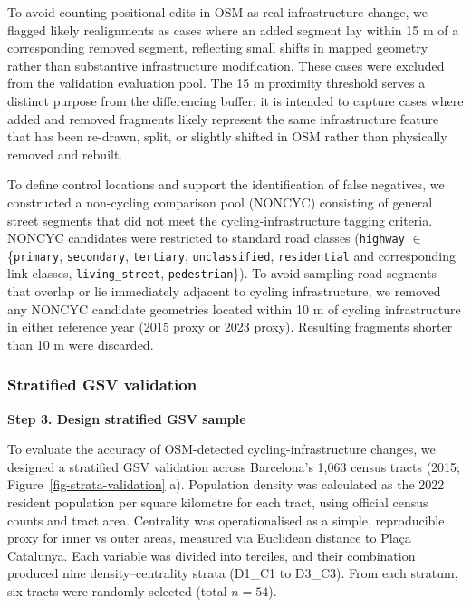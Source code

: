\documentclass[
]{article}
\begin{document}
To avoid counting positional edits in OSM as real infrastructure change,
we flagged likely realignments as cases where an added segment lay
within 15 m of a corresponding removed segment, reflecting small shifts
in mapped geometry rather than substantive infrastructure modification.
These cases were excluded from the validation evaluation pool. The 15 m
proximity threshold serves a distinct purpose from the differencing
buffer: it is intended to capture cases where added and removed
fragments likely represent the same infrastructure feature that has been
re-drawn, split, or slightly shifted in OSM rather than physically
removed and rebuilt.

To define control locations and support the identification of false
negatives, we constructed a non-cycling comparison pool (NONCYC)
consisting of general street segments that did not meet the
cycling-infrastructure tagging criteria. NONCYC candidates were
restricted to standard road classes (\texttt{highway} \(\in\)
\{\texttt{primary}, \texttt{secondary}, \texttt{tertiary},
\texttt{unclassified}, \texttt{residential} and corresponding link
classes, \texttt{living\_street}, \texttt{pedestrian}\}). To avoid
sampling road segments that overlap or lie immediately adjacent to
cycling infrastructure, we removed any NONCYC candidate geometries
located within 10 m of cycling infrastructure in either reference year
(2015 proxy or 2023 proxy). Resulting fragments shorter than 10 m were
discarded.

\subsubsection{Stratified GSV
validation}\label{stratified-gsv-validation}

\textbf{Step 3. Design stratified GSV sample}

To evaluate the accuracy of OSM-detected cycling-infrastructure changes,
we designed a stratified GSV validation across Barcelona's 1,063 census
tracts (2015; Figure~\ref{fig-strata-validation} a). Population density
was calculated as the 2022 resident population per square kilometre for
each tract, using official census counts and tract area. Centrality was
operationalised as a simple, reproducible proxy for inner vs outer
areas, measured via Euclidean distance to Plaça Catalunya. Each variable
was divided into terciles, and their combination produced nine
density--centrality strata (D1\_C1 to D3\_C3). From each stratum, six
tracts were randomly selected (total \(n = 54\)).
\end{document}
